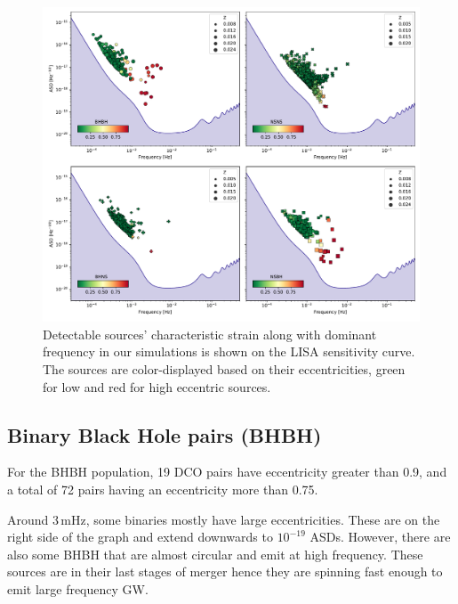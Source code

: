 \documentclass[journal, twocolumn]{IEEEtran}
\begin{document}
	\begin{figure}[!th]
		\centering
		\includegraphics[width=\textwidth]{analysis_data/main_analysis_folder/dco_typewise_snr}
		\caption{Detectable sources' characteristic strain along with dominant frequency in our simulations is shown on the LISA sensitivity curve. The sources are color-displayed based on their eccentricities, green for low and red for high eccentric sources.}
		\label{fig:alldcosnrplotting}
	\end{figure}

	\subsection{Binary Black Hole pairs (BHBH)}
	\label{subsec:binary-black-hole-pairs-(bhbh)}
	For the BHBH population, 19 DCO pairs have eccentricity greater than 0.9, and a total of 72 pairs having an eccentricity more than 0.75. 

    Around $3\,\text{mHz}$, some binaries mostly have large eccentricities.
    These are on the right side of the graph and extend downwards to $10^{-19}$ ASDs. However, there are also some BHBH that are almost circular and emit at high frequency.
    These sources are in their last stages of merger hence they are spinning fast enough to emit large frequency GW\@.
\end{document}
